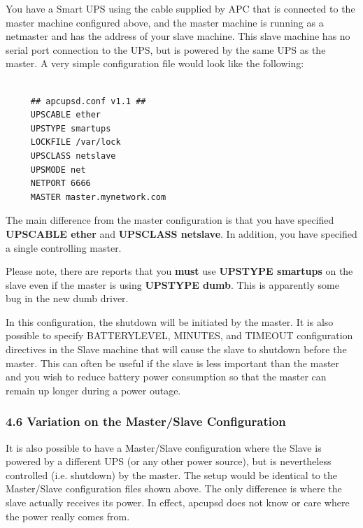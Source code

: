 \label{index-Slave-Configuration-77}
\label{index-Configuration_002c-Slave-78}
\label{index-Example_002c-Slave-conf-79}
You have a Smart UPS using the cable supplied by APC that is connected to the
master machine configured above, and the master machine is running as a
netmaster and has the address of your slave machine.  This slave machine has
no serial port connection to the UPS, but is powered by the same UPS as the
master.  A very simple configuration file would look like the following: 

\footnotesize
\begin{verbatim}
     
     ## apcupsd.conf v1.1 ##
     UPSCABLE ether
     UPSTYPE smartups
     LOCKFILE /var/lock
     UPSCLASS netslave
     UPSMODE net
     NETPORT 6666
     MASTER master.mynetwork.com
\end{verbatim}
\normalsize

The main difference from the master configuration is that you have specified
{\bf UPSCABLE ether} and {\bf UPSCLASS netslave}.  In addition, you have
specified a single controlling master.  

Please note, there are reports that you {\bf must} use {\bf UPSTYPE smartups}
on the slave even if the master is using {\bf UPSTYPE dumb}. This is
apparently some bug in the new dumb driver.  

In this configuration, the shutdown will be initiated by the master. It is
also possible to specify BATTERYLEVEL, MINUTES, and TIMEOUT configuration
directives in the Slave machine that will cause the slave to shutdown before
the master. This can often be useful if the slave is less important than the
master and you wish to reduce battery power consumption so that the master can
remain up longer during a power outage. 

\label{Variation-on-the-Master_002fSlave-Configuration}

\subsubsection*{4.6 Variation on the Master/Slave Configuration}

\label{index-Master_002fSlave-variation-80}
It is also possible to have a Master/Slave configuration where the Slave is
powered by a different UPS (or any other power source), but is nevertheless
controlled (i.e.  shutdown) by the master.  The setup would be identical to
the Master/Slave configuration files shown above.  The only difference is
where the slave actually receives its power.  In effect, apcupsd does not know
or care where the power really comes from. 

